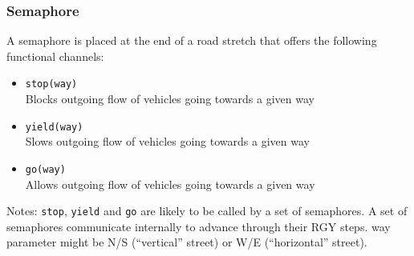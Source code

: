 \subsubsection{Semaphore}
A semaphore is placed at the end of a road stretch that offers the following functional channels:
\begin{itemize}
	\item \texttt{stop(way)}
	\\Blocks outgoing flow of vehicles going towards a given way
	\item \texttt{yield(way)}
	\\Slows outgoing flow of vehicles going towards a given way	
	\item \texttt{go(way)}
	\\Allows outgoing flow of vehicles going towards a given way
\end{itemize}
Notes:
\texttt{stop}, \texttt{yield} and \texttt{go} are likely to be called by a set of semaphores.
A set of semaphores communicate internally to advance through their RGY steps.
way parameter might be N/S (“vertical” street) or W/E (“horizontal” street).